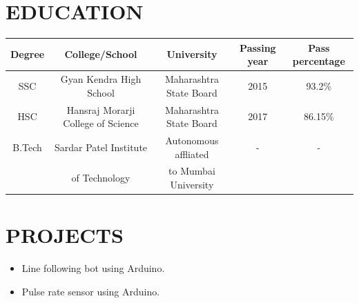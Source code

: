 \documentclass{article}
\begin{document}
\section*{\textbf{EDUCATION}}
\begin{tabular}{|c|c|c|c|c|}
\hline
Degree & College/School & University & Passing year & Pass percentage\\
\hline
SSC & Gyan Kendra High School & Maharashtra State Board & 2015 & 93.2\%\\
\hline
HSC & Hansraj Morarji College of Science & Maharashtra State Board & 2017 & 86.15\%\\
\hline
B.Tech & Sardar Patel Institute& Autonomous affliated  & - & -\\
 & of Technology & to Mumbai University & & \\
\hline 
\end{tabular}


\section*{\textbf{PROJECTS}}
\begin{itemize}
\item Line following bot using Arduino.
\item Pulse rate sensor using Arduino.
\end{itemize}
\end{document}
